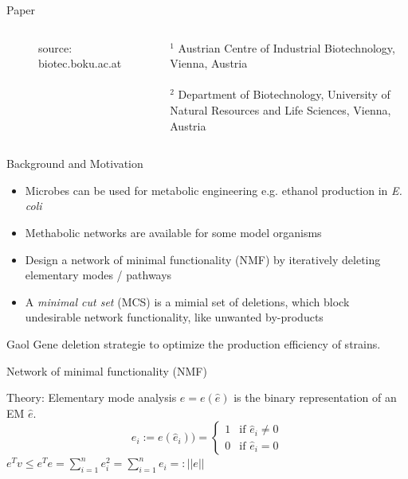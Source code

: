 \documentclass{beamer}
\begin{document}
\begin{frame}{Paper}
\begin{columns}
\begin{center}
\begin{figure}
         \tiny{source: biotec.boku.ac.at}
        \end{figure}
      \end{center}
    \tiny {$^{1}$ Austrian Centre of Industrial 
        Biotechnology, Vienna, Austria} 
    \\ ~ \\
    \tiny {$^{2}$ Department of Biotechnology, 
        University of Natural Resources and Life Sciences, 
        Vienna, Austria} 
 \end{columns}
\end{frame}

\begin{frame}{Background and Motivation}
    \begin{itemize}
        \item Microbes can be used for metabolic engineering 
        e.g. ethanol production in \emph{E. coli}
        \item Methabolic networks are available for some model organisms
    	\item Design a network of minimal functionality (NMF) by iteratively deleting elementary modes / pathways 
		\item 
			\begin{definition}
				A \emph{minimal cut set} (MCS) is a mimial set of deletions, 
				which block undesirable network functionality, like unwanted by-products
			\end{definition}
    \end{itemize}

    \begin{block}{Gaol}
        Gene deletion strategie to optimize the production 
        efficiency of strains.
    \end{block}
\end{frame}


\begin{frame}{Network of minimal functionality (NMF)}
    
\end{frame}

\begin{frame}{Theory: Elementary mode analysis}
    $e = e(\hat{e}) $ is the binary representation of an EM $\hat{e}$.
    \begin{equation}
        e_{i} := e(\hat{e}_{i})) = 
        \begin{cases}
            1 & \text{if }  \hat{e}_{i} \neq 0 \\
            0 & \text{if }  \hat{e}_{i} = 0 
        \end{cases}
    \end{equation}
    $ e^{T}v \leq e^{T}e = \sum_{i=1}^{n} e_{i}^{2} = \sum_{i=1}^{n} e_{i} =: ||e||$

\end{frame}
\end{document}
